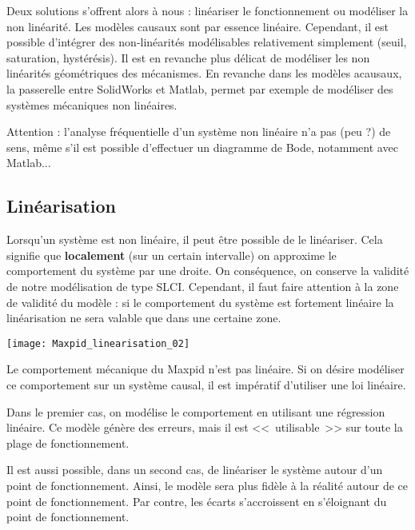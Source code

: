 Deux solutions s'offrent alors à nous : linéariser le fonctionnement ou modéliser la non linéarité. 
Les modèles causaux sont par essence linéaire. Cependant, il est possible d'intégrer des non-linéarités modélisables relativement simplement (seuil, saturation, hystérésis). Il est en revanche plus délicat de modéliser les non linéarités géométriques des mécanismes. 
En revanche dans les modèles acausaux, la passerelle entre SolidWorks et Matlab, permet par exemple de modéliser des systèmes mécaniques non linéaires.

\begin{warn}
Attention : l'analyse fréquentielle d'un système non linéaire n'a pas (peu ?) de sens, même s'il est possible d'effectuer un diagramme de Bode, notamment avec Matlab...
\end{warn}

\subsection{Linéarisation}
Lorsqu'un système est non linéaire, il peut être possible de le linéariser. Cela signifie que \textbf{localement} (sur un certain intervalle) on approxime le comportement du système par une droite. On conséquence, on conserve la validité de notre modélisation de type SLCI. Cependant, il faut faire attention à la zone de validité du modèle : si le comportement du système est fortement linéaire la linéarisation ne sera valable que dans une certaine zone.


\begin{marginfigure}[2cm]
\texttt{[image: Maxpid\_linearisation\_02]}
\end{marginfigure}

\begin{exemple}[title=Exemple -- Loi entrée sortie du Maxpid]
Le comportement mécanique du Maxpid n'est pas linéaire. Si on désire modéliser ce comportement sur un système causal, il est impératif d'utiliser une loi linéaire. 

Dans le premier cas, on modélise le comportement en utilisant une régression linéaire. 
Ce modèle génère des erreurs, mais il est <<~utilisable~>> sur toute la plage de fonctionnement. 

Il est aussi possible, dans un second cas, de linéariser le système autour d'un point de fonctionnement. Ainsi, le modèle sera plus fidèle à la réalité autour de ce point de fonctionnement. Par contre, les écarts s'accroissent en s'éloignant du point de fonctionnement. 

\end{exemple}

